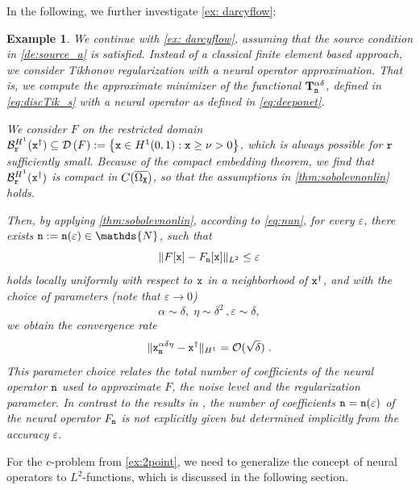 \documentclass[10pt]{article}
\numberwithin{equation}{section}
\newtheorem{example}[example]{Example}
\theoremstyle{nonumberplain}
\newcommand{\N}{\mathds{N}}
\newcommand{\dom}[1]{\mathcal{D}\left(#1\right)}
\newcommand{\norms}[1]{\|#1\|}
\newcommand{\set}[1]{\left\{#1\right\}}
\newcommand{\ve}{\varepsilon}
\newcommand{\X}{{\tt X}}
\newcommand{\n}{{\tt n}}
\newcommand{\x}{{\tt x}}
\newcommand{\xdag}{\x^\dagger}
\newcommand{\Tik}{\mathbf{T}}
\begin{document}
In the following, we further investigate \autoref{ex: darcyflow}:
\begin{example} \label{eg:aNN}
	We continue with \autoref{ex: darcyflow}, assuming that the source condition in \autoref{de:source_a} is satisfied. Instead of a classical finite element based approach, we consider Tikhonov regularization with a neural operator approximation. That is, we compute the approximate minimizer of the functional $\Tik_{\n}^{\alpha\delta}$, defined in \autoref{eq:discTik_s} with a neural operator as defined in \autoref{eq:deeponet}. 


We consider $F$ on the restricted domain $\mathcal{B}_{\tt r}^{H^1}(\xdag) \subseteq \dom{F}:= \set{\x \in H^1(0,1): \x \geq \nu>0}$, which is always possible for ${\tt r}$ sufficiently small. Because of the compact embedding theorem, we find that $\mathcal{B}_{\tt r}^{H^1}(\xdag)$ is compact in $C(\overline{\Omega_\X})$, so that the assumptions in \autoref{thm:sobolevnonlin} holds.

Then, by applying \autoref{thm:sobolevnonlin}, according to \autoref{eq:nun}, for every $\ve$, there exists $\n:= \n(\ve) \in \N$, such that 
	\begin{equation*}
		\norms{F[\x]-F_{\n}[\x]}_{L^2} \leq \ve
	\end{equation*}
holds locally uniformly with respect to $\x$ in a neighborhood of $\xdag$, and with the choice of parameters (note that $\ve \to 0$)
	\begin{equation*}
		\alpha \sim \delta, \; \eta \sim \delta^2 \,, \ve \sim \delta,
	\end{equation*}
    we obtain the convergence rate
    \begin{equation}\label{eq:ex_a_nn}
        \norms{\x_\n^{\alpha\delta\eta}-\xdag}_{H^1} = \mathcal{O}(\sqrt{\delta})\;. 
    \end{equation} 
    This parameter choice relates the total number of coefficients of the neural operator $\n$ used to approximate $F$, the noise level and the regularization parameter. In contrast to the results in \cite{NeuSch90}, the number of coefficients $\n=\n(\ve)$ of the neural operator $F_\n$ is not explicitly given but determined \emph{implicitly} from the accuracy $\ve$.
\end{example}

For the $c$-problem from \autoref{ex:2point}, we need to generalize the concept of neural operators to $L^2$-functions, which is discussed in the following section.
\end{document}
